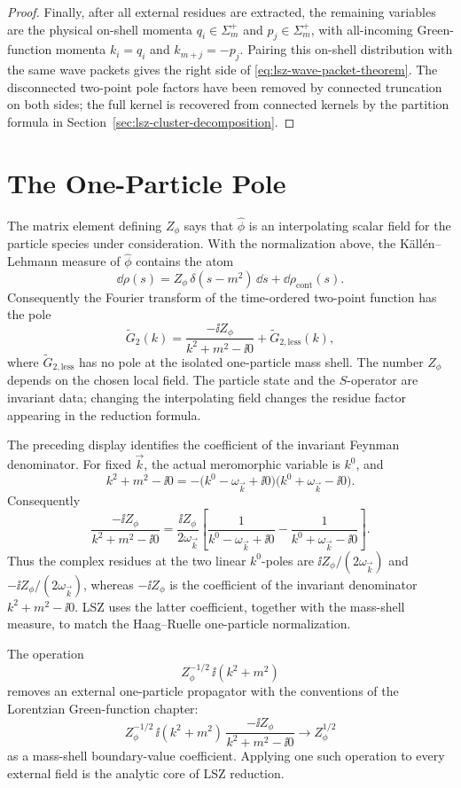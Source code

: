 \begin{proof}
Finally, after all external residues are extracted, the remaining variables
are the physical on-shell momenta \(q_i\in\Sigma_m^+\) and
\(p_j\in\Sigma_m^+\), with all-incoming Green-function momenta
\(k_i=q_i\) and \(k_{m+j}=-p_j\).  Pairing this on-shell distribution with the
same wave packets gives the right side of
\eqref{eq:lsz-wave-packet-theorem}.  The disconnected two-point pole factors
have been removed by connected truncation on both sides; the full kernel is
recovered from connected kernels by the partition formula in
Section~\ref{sec:lsz-cluster-decomposition}.
\end{proof}

\section{The One-Particle Pole}

\begin{definition}
\label{def:lsz-interpolating-field-pole-datum}
The matrix element defining \(Z_\phi\) says that \(\widehat\phi\) is an interpolating
scalar field for the particle species under consideration. With the
normalization above, the K\"all\'en--Lehmann measure of \(\widehat\phi\)
contains the atom
\[
  \dd\rho(s)=Z_\phi\,\delta(s-m^2)\,\dd s+\dd\rho_{\mathrm{cont}}(s).
\]
Consequently the Fourier transform of the time-ordered two-point function has
the pole
\[
  \widetilde G_2(k)
  =
  \frac{-\ii Z_\phi}{k^2+m^2-\ii0}
  +
  \widetilde G_{2,\mathrm{less}}(k),
\]
where \(\widetilde G_{2,\mathrm{less}}\) has no pole at the isolated
one-particle mass shell. The number \(Z_\phi\) depends on the chosen local field.
The particle state and the \(S\)-operator are invariant data; changing the
interpolating field changes the residue factor appearing in the reduction
formula.

The preceding display identifies the coefficient of the invariant Feynman
denominator.  For fixed \(\vec k\), the actual meromorphic variable is
\(k^0\), and
\[
  k^2+m^2-\ii0
  =
  -\bigl(k^0-\omega_{\vec k}+\ii0\bigr)
    \bigl(k^0+\omega_{\vec k}-\ii0\bigr).
\]
Consequently
\[
  \frac{-\ii Z_\phi}{k^2+m^2-\ii0}
  =
  \frac{\ii Z_\phi}{2\omega_{\vec k}}
  \left[
    \frac{1}{k^0-\omega_{\vec k}+\ii0}
    -
    \frac{1}{k^0+\omega_{\vec k}-\ii0}
  \right].
\]
Thus the complex residues at the two linear \(k^0\)-poles are
\(\ii Z_\phi/(2\omega_{\vec k})\) and \(-\ii Z_\phi/(2\omega_{\vec k})\), whereas
\(-\ii Z_\phi\) is the coefficient of the invariant denominator
\(k^2+m^2-\ii0\).  LSZ uses the latter coefficient, together with the
mass-shell measure, to match the Haag--Ruelle one-particle normalization.

The operation
\[
  Z_\phi^{-1/2}\,\ii(k^2+m^2)
\]
removes an external one-particle propagator with the conventions of the
Lorentzian Green-function chapter:
\[
  Z_\phi^{-1/2}\,\ii(k^2+m^2)\,
  \frac{-\ii Z_\phi}{k^2+m^2-\ii0}
  \longrightarrow
  Z_\phi^{1/2}
\]
as a mass-shell boundary-value coefficient. Applying one such operation to
every external field is the analytic core of LSZ reduction.
\end{definition}

